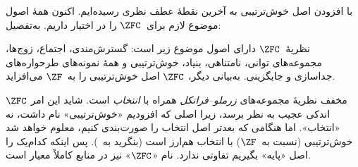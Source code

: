 \documentclass[../../../include/open-logic-section]{subfiles}
\begin{document}

با افزودن اصل خوش‌ترتیبی به آخرین نقطهٔ عطف نظری رسیده‌ایم. اکنون همهٔ
اصول موضوع لازم برای~$\ZFC$ را در اختیار داریم. به‌تفصیل:

\begin{defn}
نظریهٔ~$\ZFC$ دارای اصول موضوع زیر است: گسترش‌مندی، اجتماع، زوج‌ها،
مجموعه‌های توانی، نامتناهی، بنیاد، خوش‌ترتیبی و همهٔ نمونه‌های طرحواره‌های
جداسازی و جایگزینی. به‌بیانی دیگر، $\ZFC$ اصل خوش‌ترتیبی را به~$\ZF$
می‌افزاید.
\end{defn}

$\ZFC$ مخفف نظریهٔ مجموعه‌های \emph{زرملو--فرانکل} همراه با
\emph{انتخاب} است. شاید این امر اندکی عجیب به نظر برسد، زیرا اصلی که
افزودیم «خوش‌ترتیبی» نام داشت، نه «انتخاب». اما هنگامی که بعدتر اصل
انتخاب را صورت‌بندی کنیم، معلوم خواهد شد خوش‌ترتیبی (نسبت به~$\ZF$) با
انتخاب هم‌ارز است (بنگرید به~). پس
اینکه کدام‌یک را اصل «پایه» بگیریم تفاوتی ندارد. نام «$\ZFC$» نیز در
منابع کاملاً معیار است.
\end{document}
